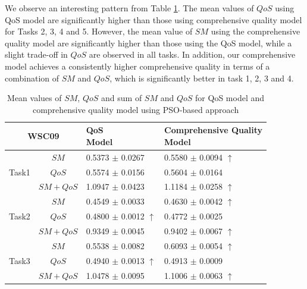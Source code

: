 \documentclass{llncs}
\begin{document}
We observe an interesting pattern from Table \ref{decisionTable}. The mean values of $QoS$ using QoS model are significantly higher than those using comprehensive quality model for Tasks 2, 3, 4 and 5. However, the mean value of $SM$ using the comprehensive quality model are significantly higher than those using the QoS model, while a slight trade-off in $QoS$ are observed in all tasks. In addition, our comprehensive model achieves a consistently higher comprehensive quality in terms of a combination of $SM$ and $QoS$, which is significantly better in task 1, 2, 3 and 4. 
\vspace{-0.8cm}
\begin{table}[]
\footnotesize
\centering
\caption{Mean values of $SM$, $QoS$ and sum of $SM$ and $QoS$ for QoS model and comprehensive quality model using PSO-based approach}
\label{decisionTable}
\begin{tabular}{c|c|l|l}
\hline
\multicolumn{2}{c|}{WSC09}              & \shortstack{QoS \\ Model}         &\shortstack{Comprehensive Quality \\ Model} \\ \hline
\multirow{3}{*}{Task1}  &$SM$      &0.5373 $\pm$ 0.0267               &0.5580 $\pm$ 0.0094 $\uparrow$ \\ \cline{2-4}
                        &$QoS$     &0.5574 $\pm$ 0.0156               &0.5604 $\pm$ 0.0164            \\ \cline{2-4}
                        &$SM+QoS$  &1.0947 $\pm$ 0.0423               &1.1184 $\pm$ 0.0258 $\uparrow$ \\ \hline
\multirow{3}{*}{Task2}  &$SM$      &0.4549 $\pm$ 0.0033               &0.4630 $\pm$ 0.0042 $\uparrow$ \\ \cline{2-4} 
                        &$QoS$     &0.4800 $\pm$ 0.0012 $\uparrow$    &0.4772 $\pm$ 0.0025            \\ \cline{2-4}
                        &$SM+QoS$  &0.9349 $\pm$ 0.0045               &0.9402 $\pm$ 0.0067 $\uparrow$           \\ \hline
\multirow{3}{*}{Task3}  &$SM$      &0.5538 $\pm$ 0.0082               &0.6093 $\pm$ 0.0054 $\uparrow$ \\ \cline{2-4} 
                        &$QoS$     &0.4940 $\pm$ 0.0013 $\uparrow$    &0.4913 $\pm$ 0.0009            \\ \cline{2-4}
                        &$SM+QoS$  &1.0478 $\pm$ 0.0095               &1.1006 $\pm$ 0.0063 $\uparrow$           \\ \hline

\end{tabular}
\end{table}
\end{document}
